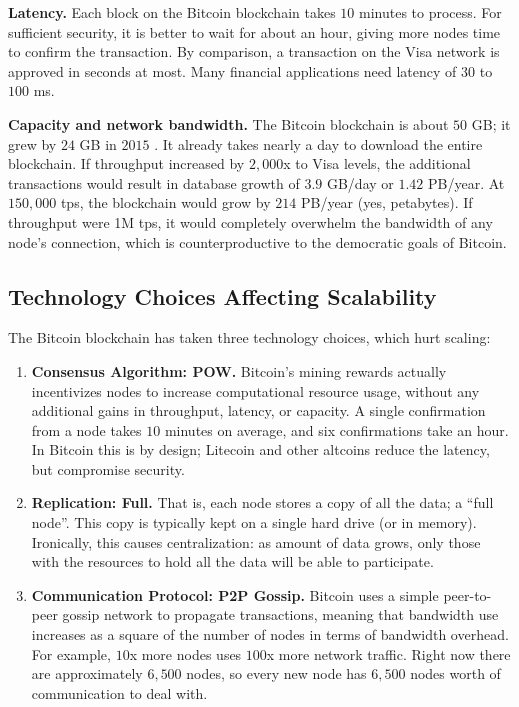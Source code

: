\medskip
\noindent\textbf{Latency.} Each block on the Bitcoin blockchain takes $10$ minutes to process.
For sufficient security, it is better to wait for about an hour, giving more nodes time to confirm the transaction.
By comparison, a transaction on the Visa network is approved in seconds at most.
Many financial applications need latency of $30$ to $100$ ms.

\medskip
\noindent\textbf{Capacity and network bandwidth.} The Bitcoin blockchain is about $50$ GB; it grew by $24$ GB in $2015$ \cite{blockchaininfo2015blockchain_size}.
It already takes nearly a day to download the entire blockchain.
If throughput increased by $2,000$x to Visa levels, the additional transactions would result in database growth of $3.9$ GB/day or $1.42$ PB/year.
At $150,000$ tps, the blockchain would grow by $214$ PB/year (yes, petabytes).
If throughput were 1M tps, it would completely overwhelm the bandwidth of any node’s connection, which is counterproductive to the democratic goals of Bitcoin.

\subsection{Technology Choices Affecting Scalability}
The Bitcoin blockchain has taken three technology choices, which hurt scaling:
\begin{enumerate}
 \item \textbf{Consensus Algorithm: POW.} Bitcoin’s mining rewards actually incentivizes nodes to increase computational resource usage, without any additional gains in throughput, latency, or capacity. A single confirmation from a node takes $10$ minutes on average, and six confirmations take an hour. In Bitcoin this is by design; Litecoin and other altcoins reduce the latency, but compromise security.
 \item \textbf{Replication: Full.} That is, each node stores a copy of all the data; a “full node”. This copy is typically kept on a single hard drive (or in memory). Ironically, this causes centralization: as amount of data grows, only those with the resources to hold all the data will be able to participate.
 \item \textbf{Communication Protocol: P2P Gossip.} Bitcoin uses a simple peer-to-peer gossip network to propagate transactions, meaning that bandwidth use increases as a square of the number of nodes in terms of bandwidth overhead. For example, $10$x more nodes uses $100$x more network traffic. Right now there are approximately $6,500$ nodes, so every new node has $6,500$ nodes worth of communication to deal with.
\end{enumerate}

